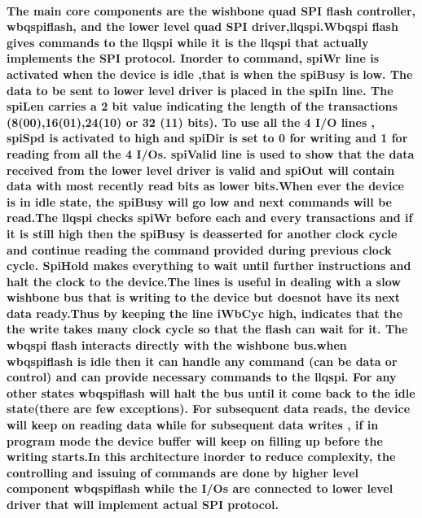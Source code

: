 \documentclass[12pt,a4paper]{report}
\begin{document}
\paragraph{\textrm{\textmd{ The main core components are the wishbone quad SPI flash controller, wbqspiflash, and the lower level quad SPI driver,llqspi.Wbqspi flash gives commands to the llqspi while it is the llqspi that actually implements the SPI protocol. Inorder to command, \textbf{spiWr} line is activated when the device is idle ,that is when the \textbf{spiBusy} is low. The data to be sent to lower level driver is placed in the \textbf{spiIn} line. The \textbf{spiLen} carries a 2 bit value indicating the length of the transactions (8(00),16(01),24(10) or 32 (11) bits). To use all the 4 I/O lines , \textbf{spiSpd} is activated to high and \textbf{spiDir} is set to 0 for writing and 1 for reading from all the 4 I/Os. \textbf{spiValid} line is used to show that the data received from the lower level driver is valid and \textbf{spiOut} will contain data with most recently read bits as lower bits.When ever the device is in idle state, the \textbf{spiBusy} will go low and next commands will be read.The llqspi checks \textbf{spiWr} before each and every transactions and if it is still high then the \textbf{spiBusy} is deasserted for another clock cycle and continue reading the command provided during previous clock cycle. \textbf{SpiHold} makes everything to wait until further instructions and halt the clock to the device.The lines is useful in dealing with a slow wishbone bus that is writing to the device but doesnot have its next data ready.Thus by keeping the line \textbf{iWbCyc} high, indicates that the the write takes many clock cycle so that the flash can wait for it.	The wbqspi flash interacts directly with the wishbone bus.when wbqspiflash is idle then it can handle any command (can be data or control) and can provide necessary commands to the llqspi. For any other states wbqspiflash will halt the bus until it come back to the idle state(there are few exceptions). For subsequent data reads, the device will keep on reading data while for subsequent data writes , if in program mode the device buffer will keep on filling up before the writing starts.In this architecture inorder to reduce complexity, the controlling and issuing of commands are done by higher level component wbqspiflash while the I/Os are connected to lower level driver that will implement actual SPI protocol. }}}
\end{document}
